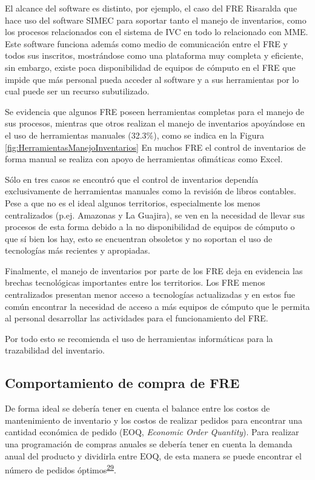 \documentclass[
]{book}
\begin{document}
El alcance del software es distinto, por ejemplo, el caso del FRE Risaralda que hace uso del software SIMEC para soportar tanto el manejo de inventarios, como los procesos relacionados con el sistema de IVC en todo lo relacionado con MME. Este software funciona además como medio de comunicación entre el FRE y todos sus inscritos, mostrándose como una plataforma muy completa y eficiente, sin embargo, existe poca disponibilidad de equipos de cómputo en el FRE que impide que más personal pueda acceder al software y a sus herramientas por lo cual puede ser un recurso subutilizado.

Se evidencia que algunos FRE poseen herramientas completas para el manejo de sus procesos, mientras que otros realizan el manejo de inventarios apoyándose en el uso de herramientas manuales (32.3\%), como se indica en la Figura \ref{fig:HerramientasManejoInventarios} En muchos FRE el control de inventarios de forma manual se realiza con apoyo de herramientas ofimáticas como Excel.

Sólo en tres casos se encontró que el control de inventarios dependía exclusivamente de herramientas manuales como la revisión de libros contables. Pese a que no es el ideal algunos territorios, especialmente los menos centralizados (p.ej. Amazonas y La Guajira), se ven en la necesidad de llevar sus procesos de esta forma debido a la no disponibilidad de equipos de cómputo o que sí bien los hay, esto se encuentran obsoletos y no soportan el uso de tecnologías más recientes y apropiadas.

Finalmente, el manejo de inventarios por parte de los FRE deja en evidencia las brechas tecnológicas importantes entre los territorios. Los FRE menos centralizados presentan menor acceso a tecnologías actualizadas y en estos fue común encontrar la necesidad de acceso a más equipos de cómputo que le permita al personal desarrollar las actividades para el funcionamiento del FRE.

Por todo esto se recomienda el uso de herramientas informáticas para la trazabilidad del inventario.

\hypertarget{comportamiento-de-compra-de-fre}{%
\subsection{Comportamiento de compra de FRE}\label{comportamiento-de-compra-de-fre}}

De forma ideal se debería tener en cuenta el balance entre los costos de mantenimiento de inventario y los costos de realizar pedidos para encontrar una cantidad económica de pedido (\(\mathrm{EOQ}\), \emph{Economic Order Quantity}). Para realizar una programación de compras anuales se debería tener en cuenta la demanda anual del producto y dividirla entre \(\mathrm{EOQ}\), de esta manera se puede encontrar el número de pedidos óptimos\textsuperscript{\protect\hyperlink{ref-Silver2017}{29}}.
\end{document}
